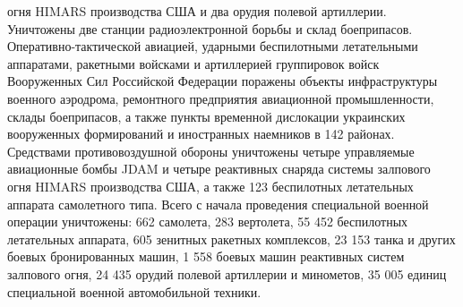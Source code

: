 \documentclass{article}
\begin{document}
огня HIMARS производства США и два орудия полевой артиллерии. Уничтожены две станции радиоэлектронной борьбы и склад боеприпасов.  Оперативно-тактической авиацией, ударными беспилотными летательными аппаратами, ракетными войсками и артиллерией группировок войск Вооруженных Сил Российской Федерации поражены объекты инфраструктуры военного аэродрома, ремонтного предприятия авиационной промышленности, склады боеприпасов, а также пункты временной дислокации украинских вооруженных формирований и иностранных наемников в 142 районах.  Средствами противовоздушной обороны уничтожены четыре управляемые авиационные бомбы JDAM и четыре реактивных снаряда системы залпового огня HIMARS производства США, а также 123 беспилотных летательных аппарата самолетного типа.  Всего с начала проведения специальной военной операции уничтожены: 662 самолета,  283 вертолета,  55 452 беспилотных летательных аппарата,  605 зенитных ракетных комплексов,  23 153 танка и других боевых бронированных машин,  1 558 боевых машин реактивных систем залпового огня,  24 435 орудий полевой артиллерии и минометов,  35 005 единиц специальной военной автомобильной техники.
\end{document}
